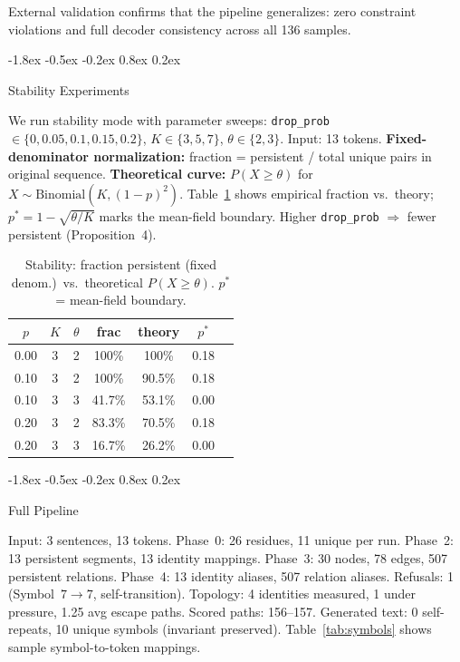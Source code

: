\documentclass[10pt]{article}
\makeatletter
\renewcommand{\subsection}{\@startsection{subsection}{2}{\z@}%
  {-1.8ex \@plus -0.5ex \@minus -0.2ex}%
  {0.8ex \@plus 0.2ex}%
  {\normalsize\bfseries\raggedright}}
\makeatother
\begin{document}
External validation confirms that the pipeline generalizes: zero constraint violations
and full decoder consistency across all 136 samples.

\subsection{Stability Experiments}

We run stability mode with parameter sweeps:
\texttt{drop\_prob} $\in \{0, 0.05, 0.1, 0.15, 0.2\}$,
$K \in \{3, 5, 7\}$, $\theta \in \{2, 3\}$. Input: 13 tokens.
\textbf{Fixed-denominator normalization:} fraction = persistent / total unique pairs
in original sequence. \textbf{Theoretical curve:} $P(X \geq \theta)$ for
$X \sim \text{Binomial}(K, (1-p)^2)$.
Table~\ref{tab:stability} shows empirical fraction vs.\ theory; $p^* = 1 - \sqrt{\theta/K}$
marks the mean-field boundary. Higher \texttt{drop\_prob} $\Rightarrow$ fewer persistent
(Proposition~4).

\begin{table}[t]
\centering
\caption{Stability: fraction persistent (fixed denom.)\ vs.\ theoretical
$P(X \geq \theta)$. $p^*$ = mean-field boundary.}
\label{tab:stability}
\begin{tabular}{ccccccc}
\toprule
\textbf{$p$} & \textbf{$K$} & \textbf{$\theta$} & \textbf{frac} & \textbf{theory} & \textbf{$p^*$} \\
\midrule
0.00 & 3 & 2 & 100\% & 100\%  & 0.18 \\
0.10 & 3 & 2 & 100\% & 90.5\% & 0.18 \\
0.10 & 3 & 3 & 41.7\% & 53.1\% & 0.00 \\
0.20 & 3 & 2 & 83.3\% & 70.5\% & 0.18 \\
0.20 & 3 & 3 & 16.7\% & 26.2\% & 0.00 \\
\bottomrule
\end{tabular}
\end{table}

\subsection{Full Pipeline}

Input: 3 sentences, 13 tokens. Phase~0: 26 residues, 11 unique per run. Phase~2:
13 persistent segments, 13 identity mappings. Phase~3: 30 nodes, 78 edges, 507
persistent relations. Phase~4: 13 identity aliases, 507 relation aliases. Refusals:
1 (Symbol~$7 \rightarrow 7$, self-transition). Topology: 4 identities measured,
1 under pressure, 1.25 avg escape paths. Scored paths: 156--157. Generated text:
0 self-repeats, 10 unique symbols (invariant preserved).
Table~\ref{tab:symbols} shows sample symbol-to-token mappings.
\end{document}
